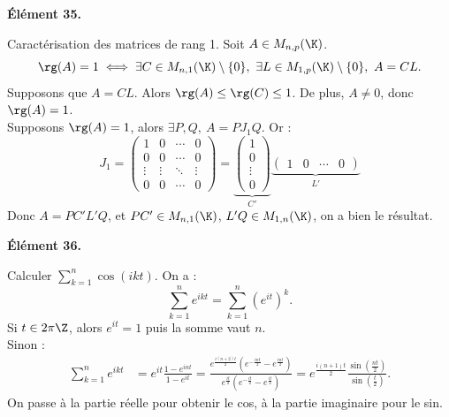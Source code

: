 \documentclass[11pt]{article}
\begin{document}
\begin{center}
    \bf{Élément 35.}
\end{center}

\begin{prop}{Caractérisation des matrices de rang 1.}{}
    Soit $A\in M_{n,p}(\K)$.
    \begin{equation*}
        \rg(A)=1 \iff \exists C \in M_{n,1}(\K)\setminus\{0\}, ~ \exists L \in M_{1,p}(\K)\setminus\{0\}, ~ A=CL.
    \end{equation*}
    \tcblower
    \boxed{\la} Supposons que $A=CL$. Alors $\rg(A)\leq \rg(C)\leq 1$. De plus, $A\neq0$, donc $\rg(A)=1$.\\
    \boxed{\ra} Supposons $\rg(A)=1$, alors $\exists P,Q, ~ A = PJ_1Q$. Or :
    \begin{equation*}
        J_1=\begin{pmatrix}
            1 & 0 & \cdots & 0\\
            0 & 0 & \cdots & 0\\
            \vdots & \vdots & \ddots & \vdots\\
            0 & 0 & \cdots & 0
        \end{pmatrix} = \underbrace{\begin{pmatrix}
            1\\
            0\\
            \vdots\\
            0
        \end{pmatrix}}_{C'}\underbrace{\begin{pmatrix}
            1 & 0 & \cdots & 0
        \end{pmatrix}}_{L'}
    \end{equation*}
    Donc $A=PC'L'Q$, et $PC'\in M_{n,1}(\K)$, $L'Q\in M_{1,n}(\K)$, on a bien le résultat. 
\end{prop}

\vspace*{-0.4cm}

\begin{center}
    \bf{Élément 36.}
\end{center}

\begin{exercice}{}{}
    Calculer $\sum_{k=1}^n \cos(ikt)$.
    \tcblower
    On a :
    \begin{equation*}
        \sum_{k=1}^ne^{ikt} = \sum_{k=1}^n(e^{it})^k.
    \end{equation*}
    Si $t\in2\pi\Z$, alors $e^{it}=1$ puis la somme vaut $n$.\\
    Sinon :
    \begin{align*}
        \sum_{k=1}^ne^{ikt} &= e^{it}\frac{1-e^{int}}{1-e^{it}} = \frac{e^{\frac{i(n+2)t}{2}}\left( e^{-\frac{int}{2}} - e^{\frac{int}{2}} \right)}{e^{\frac{it}{2}}\left( e^{-\frac{it}{2}} - e^{\frac{it}{2}} \right)} = e^{\frac{i(n+1)t}{2}}\frac{\sin\left( \frac{nt}{2} \right)}{\sin\left( \frac{t}{2} \right)}.
    \end{align*}
    On passe à la partie réelle pour obtenir le cos, à la partie imaginaire pour le sin.
\end{exercice}
\end{document}
